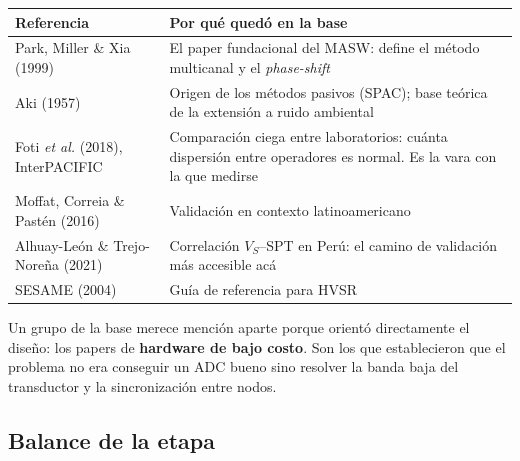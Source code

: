 \begin{center}\small
\begin{tabularx}{\textwidth}{@{}l X@{}}
\toprule
\textbf{Referencia} & \textbf{Por qu\'e qued\'o en la base} \\
\midrule
Park, Miller \& Xia (1999) & El paper fundacional del MASW: define el m\'etodo multicanal y el \emph{phase-shift} \\
Aki (1957) & Origen de los m\'etodos pasivos (SPAC); base te\'orica de la extensi\'on a ruido ambiental \\
Foti \emph{et al.} (2018), InterPACIFIC & Comparaci\'on ciega entre laboratorios: cu\'anta dispersi\'on entre operadores es normal. Es la vara con la que medirse \\
Moffat, Correia \& Past\'en (2016) & Validaci\'on en contexto latinoamericano \\
Alhuay-Le\'on \& Trejo-Nore\~na (2021) & Correlaci\'on $V_S$--SPT en Per\'u: el camino de validaci\'on m\'as accesible ac\'a \\
SESAME (2004) & Gu\'ia de referencia para HVSR \\
\bottomrule
\end{tabularx}
\end{center}

Un grupo de la base merece menci\'on aparte porque orient\'o directamente el
dise\~no: los papers de \textbf{hardware de bajo costo}. Son los que
establecieron que el problema no era conseguir un ADC bueno sino resolver la
banda baja del transductor y la sincronizaci\'on entre nodos.

\subsection{Balance de la etapa}


